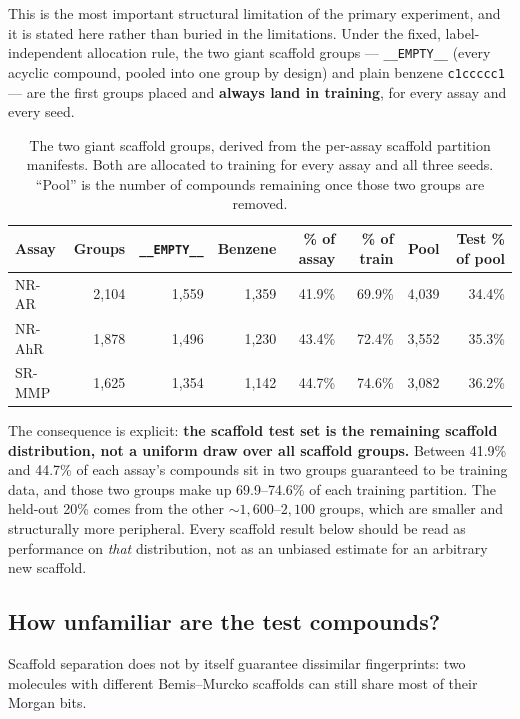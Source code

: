 \documentclass[10pt,letterpaper]{article}
\begin{document}
This is the most important structural limitation of the primary experiment, and it is stated here
rather than buried in the limitations. Under the fixed, label-independent allocation rule, the two
giant scaffold groups --- \texttt{\_\_EMPTY\_\_} (every acyclic compound, pooled into one group by
design) and plain benzene \texttt{c1ccccc1} --- are the first groups placed and \textbf{always land
in training}, for every assay and every seed.

\begin{table}[!htbp]
\centering
\footnotesize
\caption{The two giant scaffold groups, derived from the per-assay scaffold partition manifests.
Both are allocated to training for every assay and all three seeds. ``Pool'' is the number of
compounds remaining once those two groups are removed.}
\label{tab:giant}
\begin{tabular}{@{}lrrrrrrr@{}}
\toprule
Assay & Groups & \texttt{\_\_EMPTY\_\_} & Benzene & \% of assay & \% of train & Pool & Test \% of pool \\
\midrule
NR-AR  & 2{,}104 & 1{,}559 & 1{,}359 & 41.9\% & 69.9\% & 4{,}039 & 34.4\% \\
NR-AhR & 1{,}878 & 1{,}496 & 1{,}230 & 43.4\% & 72.4\% & 3{,}552 & 35.3\% \\
SR-MMP & 1{,}625 & 1{,}354 & 1{,}142 & 44.7\% & 74.6\% & 3{,}082 & 36.2\% \\
\bottomrule
\end{tabular}
\end{table}

The consequence is explicit: \textbf{the scaffold test set is the remaining scaffold distribution,
not a uniform draw over all scaffold groups.} Between 41.9\% and 44.7\% of each assay's compounds sit
in two groups guaranteed to be training data, and those two groups make up 69.9--74.6\% of each
training partition. The held-out 20\% comes from the other ${\sim}1{,}600$--$2{,}100$ groups, which
are smaller and structurally more peripheral. Every scaffold result below should be read as
performance on \emph{that} distribution, not as an unbiased estimate for an arbitrary new scaffold.

\subsection{How unfamiliar are the test compounds?}

Scaffold separation does not by itself guarantee dissimilar fingerprints: two molecules with
different Bemis--Murcko scaffolds can still share most of their Morgan bits.
\end{document}
